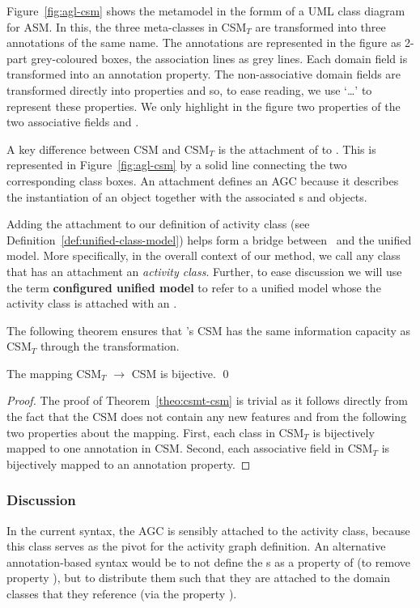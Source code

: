 Figure~\ref{fig:agl-csm} shows the metamodel in the formm of a UML class diagram for ASM. In this, the three meta-classes in CSM$_T$ are transformed into three annotations of the same name. The annotations are represented in the figure as 2-part grey-coloured boxes, the association lines as grey lines. Each domain field is transformed into an annotation property. The non-associative domain fields are transformed directly into properties and so, to ease reading, we use `\dots' to represent these properties. We only highlight in the figure two properties of the two associative fields  and . 

A key difference between CSM and CSM$_T$ is the attachment of  to . This is represented in Figure~\ref{fig:agl-csm} by a solid line connecting the two corresponding class boxes. An  attachment defines an AGC because it describes the instantiation of an  object together with the associated s and  objects.

Adding the  attachment to our definition of activity class (see Definition~\ref{def:unified-class-model}) helps form a bridge between \agl~and the unified model. More specifically, in the overall context of our method, we call any class that has an  attachment an \textit{activity class}.
Further, to ease discussion we will use the term \textbf{configured unified model} to refer to a unified model whose the activity class is attached with an .

The following theorem ensures that \agl's CSM has the same information capacity as CSM$_T$ through the transformation.
%
\begin{theorem} \label{theo:csmt-csm}
The mapping CSM$_T$ $\rightarrow$ CSM is bijective. \qed
\end{theorem}
%
\begin{proof}
The proof of Theorem~\ref{theo:csmt-csm} is trivial as it follows directly from the fact that the CSM does not contain any new features and from the following two properties about the mapping. First,  each class in CSM$_T$ is bijectively mapped to one annotation in CSM. Second, each associative field in CSM$_T$ is bijectively mapped to an annotation property.
\end{proof}
%
\subsubsection*{Discussion} \label{sect:agl-discussion} %
In the current syntax, the AGC is sensibly attached to the activity class, because this class serves as the pivot for the activity graph definition.
%
An alternative annotation-based syntax would be to not define the s as a property of  (\ie to remove property ), but to distribute them such that they are attached to the domain classes that they reference (via the property ). 

